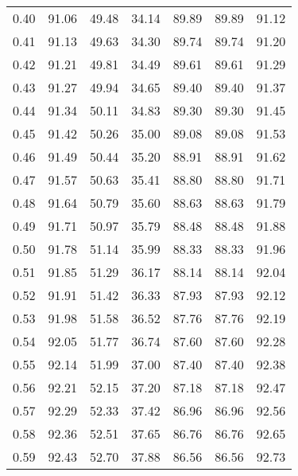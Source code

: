 \begin{tabular}{|c|c|c|c|c|c|c|}
      0.40 &     91.06 &     49.48 &      34.14 &   89.89 &      89.89 &         91.12 \\
      0.41 &     91.13 &     49.63 &      34.30 &   89.74 &      89.74 &         91.20 \\
      0.42 &     91.21 &     49.81 &      34.49 &   89.61 &      89.61 &         91.29 \\
      0.43 &     91.27 &     49.94 &      34.65 &   89.40 &      89.40 &         91.37 \\
      0.44 &     91.34 &     50.11 &      34.83 &   89.30 &      89.30 &         91.45 \\
      0.45 &     91.42 &     50.26 &      35.00 &   89.08 &      89.08 &         91.53 \\
      0.46 &     91.49 &     50.44 &      35.20 &   88.91 &      88.91 &         91.62 \\
      0.47 &     91.57 &     50.63 &      35.41 &   88.80 &      88.80 &         91.71 \\
      0.48 &     91.64 &     50.79 &      35.60 &   88.63 &      88.63 &         91.79 \\
      0.49 &     91.71 &     50.97 &      35.79 &   88.48 &      88.48 &         91.88 \\
      0.50 &     91.78 &     51.14 &      35.99 &   88.33 &      88.33 &         91.96 \\
      0.51 &     91.85 &     51.29 &      36.17 &   88.14 &      88.14 &         92.04 \\
      0.52 &     91.91 &     51.42 &      36.33 &   87.93 &      87.93 &         92.12 \\
      0.53 &     91.98 &     51.58 &      36.52 &   87.76 &      87.76 &         92.19 \\
      0.54 &     92.05 &     51.77 &      36.74 &   87.60 &      87.60 &         92.28 \\
      0.55 &     92.14 &     51.99 &      37.00 &   87.40 &      87.40 &         92.38 \\
      0.56 &     92.21 &     52.15 &      37.20 &   87.18 &      87.18 &         92.47 \\
      0.57 &     92.29 &     52.33 &      37.42 &   86.96 &      86.96 &         92.56 \\
      0.58 &     92.36 &     52.51 &      37.65 &   86.76 &      86.76 &         92.65 \\
      0.59 &     92.43 &     52.70 &      37.88 &   86.56 &      86.56 &         92.73 \\

\end{tabular}

